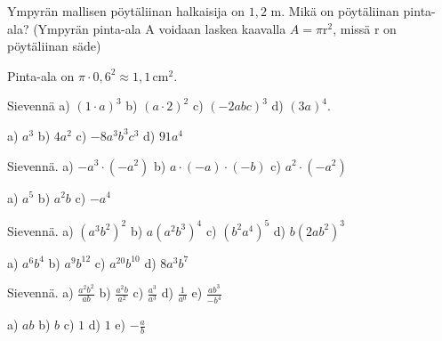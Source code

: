 \begin{tehtavasivu}
    \begin{tehtava}
        Ympyrän mallisen pöytäliinan halkaisija on $1,2$ m.  Mikä on pöytäliinan pinta-ala? (Ympyrän pinta-ala A voidaan laskea kaavalla $A=\pi\text{r}^2$, missä r on pöytäliinan säde)
        \begin{vastaus}
        Pinta-ala on $\pi \cdot 0,6^2 \approx 1,1\,$cm$^2$.
        \end{vastaus}
\end{tehtava}

 \begin{tehtava}
        Sievennä 
        a) $(1\cdot a)^3$ 
        b) $(a\cdot 2)^2$ 
        c) $(-2abc)^3$ 
        d) $(3a)^4$.

        \begin{vastaus}
            a) $a^3$ 
            b) $4a^2$ 
            c) $-8a^3b^3c^3$ 
            d) $91a^4$
        \end{vastaus}
    \end{tehtava}
    \begin{tehtava}
        Sievennä. 
        a) $-a^3\cdot(-a^2)$ 
        b) $a\cdot(-a)\cdot(-b)$ 
        c) $a^2\cdot(-a^2)$
        
        \begin{vastaus}
            a) $a^5$ 
            b) $a^2b$ 
            c) $-a^4$
        \end{vastaus}
    \end{tehtava}

    \begin{tehtava}
        Sievennä. 
        a) $(a^3b^2)^2$ 
        b) $a(a^2b^3)^4$ 
        c) $(b^2a^4)^5$ 
        d) $b(2ab^2)^3$
        
        \begin{vastaus}
            a) $a^6b^4$ 
            b) $a^9b^{12}$ 
            c) $a^{20}b^{10}$ 
            d) $8a^3b^7$
        \end{vastaus}
    \end{tehtava}
      
    
    \begin{tehtava}
        Sievennä. 
        a) $\frac{a^2b^2}{ab}$ 
        b) $\frac{a^2b}{a^2}$ 
        c) $\frac{a^3}{a^3}$ 
        d) $\frac{1}{a^0}$ 
        e) $\frac{ab^3}{-b^4}$
        
        \begin{vastaus}
            a) $ab$ 
            b) $b$ 
            c) $1$ 
            d) $1$ 
            e) $-\frac{a}{b}$
        \end{vastaus}
    \end{tehtava}
    

\end{tehtavasivu}
